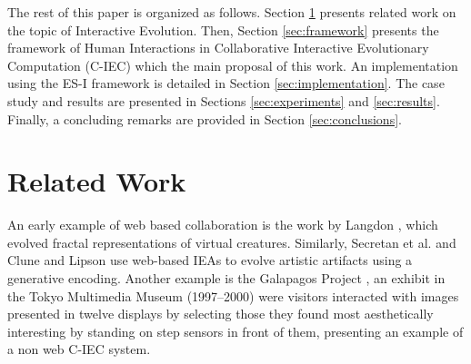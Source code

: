 The rest of this paper is organized as follows.
Section \ref{sec:related} presents related work on the topic 
of Interactive Evolution. Then, Section \ref{sec:framework} presents the framework of Human
Interactions in Collaborative Interactive Evolutionary Computation (C-IEC) which 
the main proposal of this work. An implementation using the ES-I framework 
is detailed in Section \ref{sec:implementation}.
The case study and results are presented in Sections \ref{sec:experiments} and  
\ref{sec:results}. Finally, a concluding remarks are provided in Section \ref{sec:conclusions}.

\section{Related Work}
\label{sec:related}

An early example of web based collaboration is the work by 
Langdon \cite{langdon:2004}, which evolved fractal representations of virtual creatures. 
Similarly, Secretan et al. \cite{picbreeder} and Clune and Lipson \cite{forms} 
use web-based IEAs to evolve artistic artifacts using a generative encoding.
Another example is the Galapagos Project \cite{sims1997interactivity},
an exhibit in the Tokyo Multimedia Museum (1997--2000) 
were visitors interacted with images presented in 
twelve displays by selecting those they found most aesthetically interesting by standing on
step sensors in front of them, presenting an example of a non web C-IEC system. 

